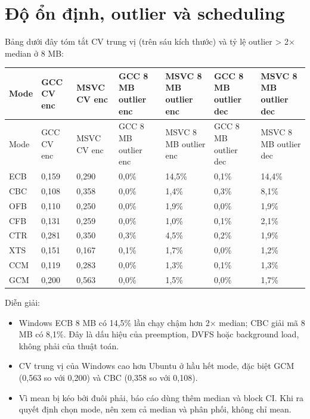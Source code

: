 \documentclass[12pt,a4paper,oneside]{report}
\begin{document}
\section{Độ ổn định, outlier và scheduling}


Bảng dưới đây tóm tắt CV trung vị (trên sáu kích thước) và tỷ lệ outlier > 2× median ở 8 MB:


\begin{longtable}{p{}p{}p{}p{}p{}p{}p{}}
\toprule
Mode & GCC CV enc & MSVC CV enc & GCC 8 MB outlier enc & MSVC 8 MB outlier enc & GCC 8 MB outlier dec & MSVC 8 MB outlier dec \\
\midrule
\endfirsthead
\toprule
Mode & GCC CV enc & MSVC CV enc & GCC 8 MB outlier enc & MSVC 8 MB outlier enc & GCC 8 MB outlier dec & MSVC 8 MB outlier dec \\
\midrule
\endhead
ECB & 0,159 & 0,290 & 0,0\% & 14,5\% & 0,1\% & 14,4\% \\
CBC & 0,108 & 0,358 & 0,0\% & 1,4\% & 0,3\% & 8,1\% \\
OFB & 0,110 & 0,250 & 0,0\% & 1,9\% & 0,0\% & 1,9\% \\
CFB & 0,131 & 0,259 & 0,0\% & 1,0\% & 0,1\% & 2,1\% \\
CTR & 0,281 & 0,350 & 0,3\% & 4,5\% & 0,2\% & 1,9\% \\
XTS & 0,151 & 0,167 & 0,1\% & 1,7\% & 0,0\% & 1,2\% \\
CCM & 0,119 & 0,283 & 0,0\% & 1,3\% & 0,1\% & 1,3\% \\
GCM & 0,200 & 0,563 & 0,0\% & 1,5\% & 0,0\% & 1,7\% \\
\bottomrule
\end{longtable}


Diễn giải:


\begin{itemize}[leftmargin=*]
\item Windows ECB 8 MB có 14,5\% lần chạy chậm hơn 2× median; CBC giải mã 8 MB có 8,1\%. Đây là dấu hiệu của preemption, DVFS hoặc background load, không phải của thuật toán.
\item CV trung vị của Windows cao hơn Ubuntu ở hầu hết mode, đặc biệt GCM (0,563 so với 0,200) và CBC (0,358 so với 0,108).
\item Vì mean bị kéo bởi đuôi phải, báo cáo dùng thêm median và block CI. Khi ra quyết định chọn mode, nên xem cả median và phân phối, không chỉ mean.
\end{itemize}
\end{document}
